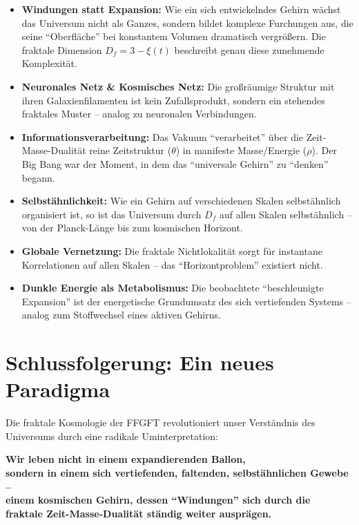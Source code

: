 \documentclass[12pt,a4paper]{article}
\begin{document}
\begin{itemize}[leftmargin=*]
\item \textbf{Windungen statt Expansion:} Wie ein sich entwickelndes Gehirn wächst das Universum nicht als Ganzes, sondern bildet komplexe Furchungen aus, die seine ``Oberfläche'' bei konstantem Volumen dramatisch vergrößern. Die fraktale Dimension $D_f = 3 - \xi(t)$ beschreibt genau diese zunehmende Komplexität.

\item \textbf{Neuronales Netz \& Kosmisches Netz:} Die großräumige Struktur mit ihren Galaxienfilamenten ist kein Zufallsprodukt, sondern ein stehendes fraktales Muster -- analog zu neuronalen Verbindungen.

\item \textbf{Informationsverarbeitung:} Das Vakuum ``verarbeitet'' über die Zeit-Masse-Dualität reine Zeitstruktur ($\theta$) in manifeste Masse/Energie ($\rho$). Der Big Bang war der Moment, in dem das ``universale Gehirn'' zu ``denken'' begann.

\item \textbf{Selbstähnlichkeit:} Wie ein Gehirn auf verschiedenen Skalen selbstähnlich organisiert ist, so ist das Universum durch $D_f$ auf allen Skalen selbstähnlich -- von der Planck-Länge bis zum kosmischen Horizont.

\item \textbf{Globale Vernetzung:} Die fraktale Nichtlokalität sorgt für instantane Korrelationen auf allen Skalen -- das ``Horizontproblem'' existiert nicht.

\item \textbf{Dunkle Energie als Metabolismus:} Die beobachtete ``beschleunigte Expansion'' ist der energetische Grundumsatz des sich vertiefenden Systems -- analog zum Stoffwechsel eines aktiven Gehirns.
\end{itemize}

\section{Schlussfolgerung: Ein neues Paradigma}

Die fraktale Kosmologie der FFGFT revolutioniert unser Verständnis des Universums durch eine radikale Uminterpretation:

\begin{center}
\textbf{Wir leben nicht in einem expandierenden Ballon,} \\
\textbf{sondern in einem sich vertiefenden, faltenden, selbstähnlichen Gewebe --} \\
\textbf{einem kosmischen Gehirn, dessen ``Windungen'' sich durch die} \\
\textbf{fraktale Zeit-Masse-Dualität ständig weiter ausprägen.}
\end{center}
\end{document}
